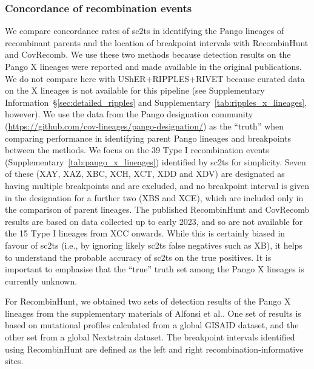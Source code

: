 \documentclass[12pt]{article}
\newcommand{\supref}[1]{Supplementary Information~\S\ref{#1}}
\newcommand{\siref}[1]{Supplementary~\ref{#1}}
\begin{document}
\subsubsection*{Concordance of recombination events}
We compare concordance rates of sc2ts in identifying the
Pango lineages of recombinant parents and the location
of breakpoint intervals with RecombinHunt\cite{Alfonsi2024} and
CovRecomb\cite{Li2024CovRecomb}.
We use these two methods because detection
results on the Pango X lineages were reported and made available
in the original publications. We do not compare here with
UShER+RIPPLES+RIVET because curated data on the X lineages is
not available for this pipeline (see \supref{sec:detailed_ripples}
and \siref{tab:ripples_x_lineages}, however).
We use the data from the Pango designation community
(\url{https://github.com/cov-lineages/pango-designation/})
as the ``truth'' when comparing performance in identifying
parent Pango lineages and breakpoints between the methods.
We focus on the 39 Type I recombination events
(\siref{tab:pango_x_lineages}) identified by sc2ts for simplicity.
Seven of these (XAY, XAZ, XBC, XCH, XCT, XDD and XDV) are designated
as having multiple breakpoints and are excluded, and
no breakpoint interval is given in the designation for a further two
(XBS and XCE), which are included only in the comparison of parent lineages.
The published RecombinHunt and CovRecomb results are based on data
collected up to early 2023, and so are not available for
the 15 Type I lineages from XCC onwards.
While this is certainly biased in favour of sc2ts (i.e., by
ignoring likely sc2ts false negatives such as XB), it helps to
understand the probable accuracy of sc2ts on the true positives.
It is important to emphasise that the ``true'' truth set among
the Pango X lineages is currently unknown.

For RecombinHunt, we obtained two sets of detection results of the Pango X lineages
from the supplementary materials of Alfonsi et al.\cite{Alfonsi2024}.
One set of results is based on mutational profiles calculated from a global GISAID dataset,
and the other set from a global Nextstrain dataset.
The breakpoint intervals identified using RecombinHunt are defined
as the left and right recombination-informative sites.
\end{document}
